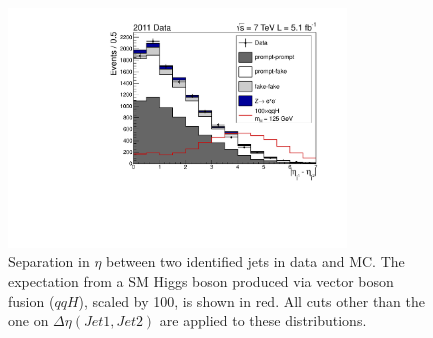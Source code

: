 \begin{figure}
\includegraphics[width=0.8\textwidth]{hgg7TeV/variablePlots/cut_VBF_dEta_sequential_cat0.pdf}
\caption{Separation in $\eta$ between two identified jets in data and MC. 
The expectation from a SM Higgs boson produced via vector boson fusion ($qqH$), scaled by 100,
is shown in red. All cuts other than the one on $\Delta\eta(Jet 1, Jet2)$ are applied to these distributions.} 
\label{fig:vbfdeta}
\end{figure}

